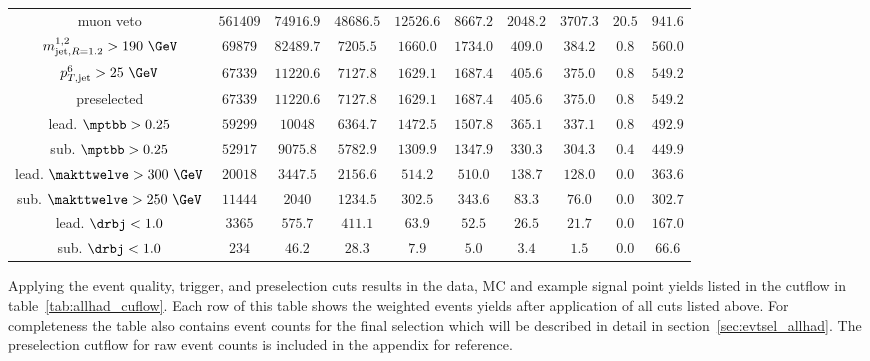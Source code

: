 \begin{table}
\begin{tabular}{c||c||c||c|c|c|c|c|c||c}
      muon veto & $561409$ & $74916.9$ & $48686.5$ & $12526.6$ & $8667.2$ & $2048.2$ & $3707.3$ & $ 20.5$ & $941.6$ \\
      $m^{1,2}_{\text{jet},R=1.2}>190~\GeV$ & $69879$ & $82489.7$ & $7205.5$ & $1660.0$ & $1734.0$ & $409.0$ & $384.2$ & $0.8$ & $560.0$ \\
      $p^6_{T,\text{jet}}>25~\GeV$ & $67339$ & $11220.6$ & $7127.8$ & $1629.1$ & $1687.4$ & $405.6$ & $375.0$ & $0.8$ & $549.2$ \\
      \hline
      preselected & $67339$ & $11220.6$ & $7127.8$ & $1629.1$ & $1687.4$ & $405.6$ & $375.0$ & $0.8$ & $549.2$ \\
      \hline
      lead. $\mptbb > 0.25$ & $59299$ & $10048$ & $6364.7$ & $1472.5$ & $1507.8$ & $365.1$ & $337.1$ & $0.8$ & $492.9$ \\
      sub. $\mptbb > 0.25$ & $52917$ & $9075.8$ & $5782.9$ & $1309.9$ & $1347.9$ & $330.3$ & $304.3$ & $0.4$ & $449.9$ \\
      lead. $\makttwelve > 300~\GeV$ & $20018$ & $3447.5$ & $2156.6$ & $514.2$ & $510.0$ & $138.7$ & $128.0$ & $0.0$ & $363.6$ \\
      sub. $\makttwelve > 250~\GeV$ & $11444$ & $2040$ & $1234.5$ & $302.5$ & $343.6$ & $83.3$ & $76.0$ & $0.0$ & $302.7$ \\
      lead. $\drbj < 1.0$ & $3365$ & $575.7$ & $411.1$ & $63.9$ & $52.5$ & $26.5$ & $21.7$ & $0.0$ & $167.0$ \\
      sub. $\drbj < 1.0$ & $234$ & $46.2$ & $28.3$ & $7.9$ & $5.0$ & $3.4$ & $1.5$ & $0.0$ & $66.6$ \\
    \end{tabular}
\end{table}

Applying the event quality, trigger, and preselection cuts results in the data, MC and example signal point yields listed in the cutflow in table~\ref{tab:allhad_cuflow}. Each row of this table shows the weighted events yields after application of all cuts listed above. For completeness the table also contains event counts for the final selection which will be described in detail in section~\ref{sec:evtsel_allhad}.
The preselection cutflow for raw event counts is included in the appendix for reference. 

